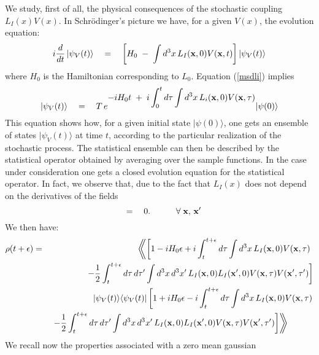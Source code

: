 \documentclass[12pt]{article}
\newcommand{\LLangle}{\left\langle\!\!\!\left\langle}
\newcommand{\RRangle}{\right\rangle\!\!\!\right\rangle}
\begin{document}
We study, first of all, the physical consequences of the
stochastic coupling $L_{I}(x) V(x)$. In Schr\"odinger's picture we
have, for a given $V(x)$, the evolution equation:
\begin{equation} \label{msdli}
i\frac{d}{dt}\, |\psi_{V}(t)\rangle \quad = \quad \left[ H_{0} \;
- \; \int d^{3}x\, L_{I}({\bf x}, 0) V({\bf x}, t) \right]
|\psi_{V}(t)\rangle
\end{equation} where $H_{0}$ is the Hamiltonian corresponding to $L_{0}$.
Equation (\ref{msdli}) implies
\begin{equation} \label{cito}
|\psi_{V}(t)\rangle \quad = \quad T\, e^{\displaystyle -i H_{0}t
\; + \; i\int_{0}^{t}d\tau \int d^{3}x\, L_{i}({\bf x}, 0) V({\bf
x}, \tau)} |\psi(0)\rangle
\end{equation}
This equation shows how, for a given initial state
$|\psi(0)\rangle$, one gets an ensemble of states
$|\psi_{V}(t)\rangle$ at time $t$, according to the particular
realization of the stochastic process. The statistical ensemble
can then be described by the statistical operator obtained by
averaging over the sample functions. In the case under
consideration one gets a closed evolution equation for the
statistical operator. In fact, we observe that, due to the fact
that $L_{I}(x)$ does not depend on the derivatives of the fields
\begin{equation}
[L_{I}({\bf x}, 0), L_{I}({\bf x}', 0)] \quad = \quad 0.
\qquad\quad \forall\; {\bf x},\, {\bf x}'
\end{equation}
We then
have:
\begin{eqnarray} \label{mcl}
\rho(t+\epsilon) & = & \LLangle\left[ 1 - iH_{0}\epsilon + i
\int_{t}^{t+\epsilon} d\tau \int d^{3} x\, L_{I}({\bf x}, 0)
V({\bf x}, \tau) \right.\right.\right. \nonumber \\
& & \left. -\frac{1}{2}\int_{t}^{t+\epsilon} d\tau \, d\tau' \int
d^{3} x \, d^{3} x'\, L_{I}({\bf x}, 0) L_{I}({\bf x}', 0) V({\bf
x}, \tau) V({\bf x}', \tau') \right]
\nonumber \\
& & |\psi_{V}(t)\rangle\langle\psi_{V}(t)| \left[ 1 +
iH_{0}\epsilon - i \int_{t}^{t+\epsilon} d\tau \int d^{3} x\,
L_{I}({\bf x}, 0) V({\bf x}, \tau)  \right. \nonumber \\
& & \left.\left.\left. -\frac{1}{2}\int_{t}^{t+\epsilon} d\tau\,
d\tau' \int d^{3} x \, d^{3} x'\, L_{I}({\bf x}, 0) L_{I}({\bf
x}', 0) V({\bf x}, \tau) V({\bf x}', \tau') \right] \RRangle
\quad\qquad
\end{eqnarray}
We recall now the properties associated with a zero mean gaussian
\end{document}
